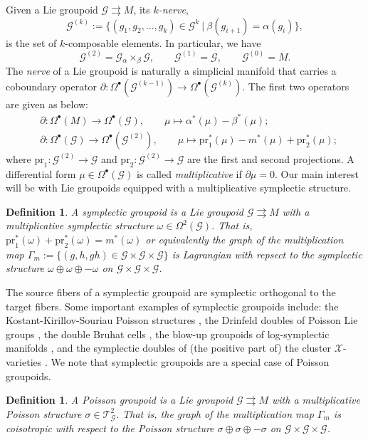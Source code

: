 \documentclass{amsart}
\newtheorem{definition}[theorem]{Definition}
\numberwithin{equation}{section}
\newcommand{\cG}{\mathcal{G}}
\newcommand{\cT}{\mathcal{T}}
\newcommand{\cX}{\mathcal{X}}
\newcommand{\rra}{\rightrightarrows}
\begin{document}
Given a Lie groupoid $\cG \rra M$, its \emph{$k$-nerve},
\[\cG^{(k)} := \{(g_1, g_2, \ldots, g_k) \in \cG^k ~|~ \beta(g_{i+1}) = \alpha(g_i)\},\]
is the set of $k$-composable elements.
In particular, we have
\[\cG^{(2)} = \cG {_\alpha \times_\beta} \cG,\qquad \cG^{(1)} = \cG,\qquad \cG^{(0)} = M.\]
The \emph{nerve} of a Lie groupoid is naturally a simplicial manifold that carries a coboundary operator $\partial: \Omega^\bullet(\cG^{(k-1)}) \to \Omega^\bullet(\cG^{(k)})$.
The first two operators are given as below:
\begin{align} 
  \label{eq:gpdcob}
  & \partial: \Omega^\bullet(M) \to \Omega^\bullet(\cG), \qquad \mu \mapsto \alpha^*(\mu) - \beta^*(\mu); \\
  \nonumber
  & \partial: \Omega^\bullet(\cG) \to \Omega^\bullet(\cG^{(2)}), \qquad \mu \mapsto \mathrm{pr}_1^*(\mu) - m^*(\mu) + \mathrm{pr}_2^*(\mu);
\end{align}
where $\mathrm{pr}_1: \cG^{(2)} \to \cG$ and $\mathrm{pr}_2: \cG^{(2)} \to \cG$ are the first and second projections.
A differential form $\mu \in \Omega^\bullet(\cG)$ is called \emph{multiplicative} if $\partial \mu = 0$.
Our main interest will be with Lie groupoids equipped with a multiplicative symplectic structure.
\begin{definition}
  A \emph{symplectic groupoid} is a Lie groupoid $\cG \rra M$ with a multiplicative symplectic structure $\omega \in \Omega^2(\cG)$.
  That is, $\mathrm{pr}_1^*(\omega)+\mathrm{pr}_2^*(\omega) = m^*(\omega)$ or equivalently the graph of the multiplication map $\Gamma_m := \{(g, h, gh) \in \cG \times \cG \times \cG\}$ is Lagrangian with repsect to the symplectic structure $\omega \oplus \omega \oplus -\omega$ on $\cG\times\cG\times\cG$.
\end{definition}

The source fibers of a symplectic groupoid are symplectic orthogonal to the target fibers.
Some important examples of symplectic groupoids include: the Kostant-Kirillov-Souriau Poisson structures \cite{CDW87}, the Drinfeld doubles of Poisson Lie groups \cite{LW89}, the double Bruhat cells \cite{LuM16}, the blow-up groupoids of log-symplectic manifolds \cite{GL14}, and the symplectic doubles of (the positive part of) the cluster $\cX$-varieties \cite{FG09c}.
We note that symplectic groupoids are a special case of Poisson groupoids.
\begin{definition}
  A \emph{Poisson groupoid} is a Lie groupoid $\cG \rra M$ with a multiplicative Poisson structure $\sigma \in \cT^2_\cG$.
  That is, the graph of the multiplication map $\Gamma_m$ is coisotropic with respect to the Poisson structure $\sigma \oplus \sigma \oplus -\sigma$ on $\cG\times\cG\times\cG$.
\end{definition}
\end{document}
